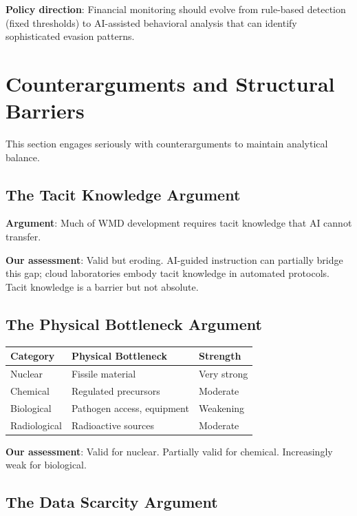 \documentclass[11pt,letterpaper]{article}
\begin{document}
\textbf{Policy direction}: Financial monitoring should evolve from rule-based detection (fixed thresholds) to AI-assisted behavioral analysis that can identify sophisticated evasion patterns.

\section{Counterarguments and Structural Barriers}

This section engages seriously with counterarguments to maintain analytical balance.

\subsection{The Tacit Knowledge Argument}

\textbf{Argument}: Much of WMD development requires tacit knowledge that AI cannot transfer.

\textbf{Our assessment}: Valid but eroding. AI-guided instruction can partially bridge this gap; cloud laboratories embody tacit knowledge in automated protocols. Tacit knowledge is a barrier but not absolute.

\subsection{The Physical Bottleneck Argument}

\begin{center}
\small
\begin{tabular}{L{3cm}L{4cm}L{3cm}}
\toprule
\textbf{Category} & \textbf{Physical Bottleneck} & \textbf{Strength} \\
\midrule
Nuclear & Fissile material & Very strong \\
Chemical & Regulated precursors & Moderate \\
Biological & Pathogen access, equipment & Weakening \\
Radiological & Radioactive sources & Moderate \\
\bottomrule
\end{tabular}
\end{center}

\textbf{Our assessment}: Valid for nuclear. Partially valid for chemical. Increasingly weak for biological.

\subsection{The Data Scarcity Argument}
\end{document}
